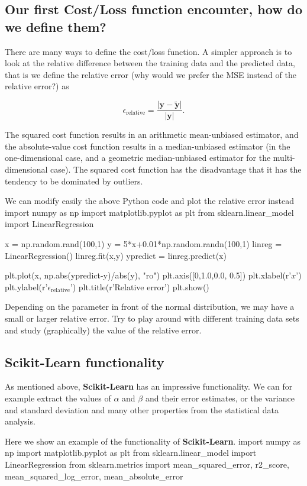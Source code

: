 \documentclass[%
oneside,                 %
final,                   %
10pt]{article}
\begin{document}
\subsection{Our first Cost/Loss function encounter, how do we define them?}


There are many ways to define the cost/loss function. A simpler approach is to look at the relative difference between the training data and the predicted data, that is we define 
the relative error (why would we prefer the MSE instead of the relative error?) as

\[
\epsilon_{\mathrm{relative}}= \frac{\vert \bm{y} -\bm{\tilde{y}}\vert}{\vert \bm{y}\vert}.
\]

The squared cost function results in an arithmetic mean-unbiased
estimator, and the absolute-value cost function results in a
median-unbiased estimator (in the one-dimensional case, and a
geometric median-unbiased estimator for the multi-dimensional
case). The squared cost function has the disadvantage that it has the tendency
to be dominated by outliers.

We can modify easily the above Python code and plot the relative error instead
\bpycod
import numpy as np
import matplotlib.pyplot as plt
from sklearn.linear_model import LinearRegression

x = np.random.rand(100,1)
y = 5*x+0.01*np.random.randn(100,1)
linreg = LinearRegression()
linreg.fit(x,y)
ypredict = linreg.predict(x)

plt.plot(x, np.abs(ypredict-y)/abs(y), "ro")
plt.axis([0,1.0,0.0, 0.5])
plt.xlabel(r'$x$')
plt.ylabel(r'$\epsilon_{\mathrm{relative}}$')
plt.title(r'Relative error')
plt.show()
\epycod

Depending on the parameter in front of the normal distribution, we may
have a small or larger relative error. Try to play around with
different training data sets and study (graphically) the value of the
relative error.

\subsection{\textbf{Scikit-Learn} functionality}


As mentioned above, \textbf{Scikit-Learn} has an impressive functionality.
We can for example extract the values of $\alpha$ and $\beta$ and
their error estimates, or the variance and standard deviation and many
other properties from the statistical data analysis. 


Here we show an
example of the functionality of \textbf{Scikit-Learn}.
\bpycod
import numpy as np 
import matplotlib.pyplot as plt 
from sklearn.linear_model import LinearRegression 
from sklearn.metrics import mean_squared_error, r2_score, mean_squared_log_error, mean_absolute_error
\end{document}
